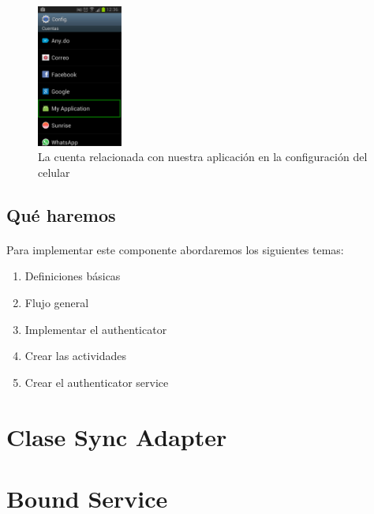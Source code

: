 \documentclass[10pt]{extarticle}
\begin{document}
\begin{figure}[H]
    \centering
    \includegraphics[width=0.25\textwidth]{app_en_accounts_settings.png}
    \caption{La cuenta relacionada con nuestra aplicación en la configuración del celular}
    \label{fig:app_en_accounts_settings}
\end{figure}

\subsection{Qué haremos}

\paragraph{}
Para implementar este componente abordaremos los siguientes temas:

\begin{enumerate}
	\item Definiciones básicas
	\item Flujo general
	\item Implementar el authenticator
	\item Crear las actividades
	\item Crear el authenticator service
\end{enumerate}


\section{Clase Sync Adapter}


\section{Bound Service}
\end{document}
